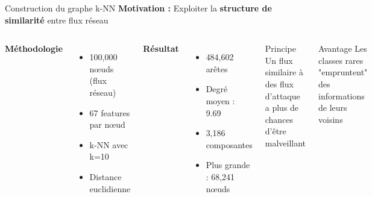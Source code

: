 ﻿\documentclass[aspectratio=169]{beamer}
\begin{document}
\begin{frame}{Construction du graphe k-NN}
\textbf{Motivation :} Exploiter la \textcolor{accentorange}{\textbf{structure de similarité}} entre flux réseau

\vspace{0.5cm}

\begin{columns}[T]
\textbf{Méthodologie}
\begin{itemize}
    \item 100,000 nœuds (flux réseau)
    \item 67 features par nœud
    \item k-NN avec k=10
    \item Distance euclidienne
\end{itemize}

\vspace{0.3cm}
\textbf{Résultat}
\begin{itemize}
    \item 484,602 arêtes
    \item Degré moyen : 9.69
    \item 3,186 composantes
    \item Plus grande : 68,241 nœuds
\end{itemize}

\begin{exampleblock}{Principe}
Un flux similaire à des flux d'attaque a plus de chances d'être malveillant
\end{exampleblock}

\vspace{0.3cm}
\begin{block}{Avantage}
Les classes rares "empruntent" des informations de leurs voisins
\end{block}
\end{columns}
\end{frame}
\end{document}
